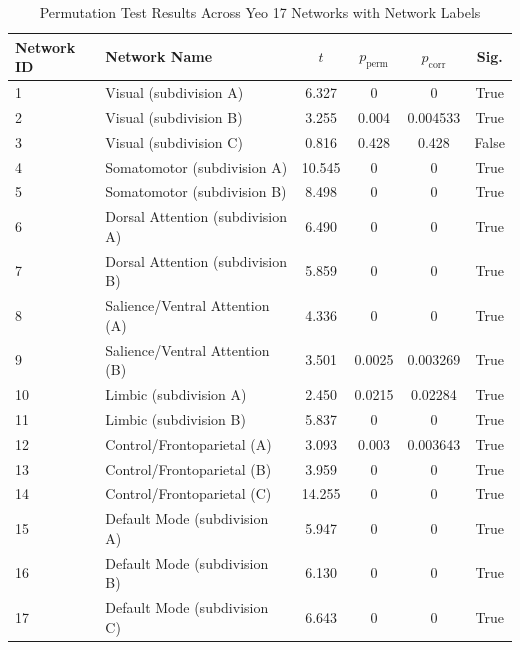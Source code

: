 \documentclass[stu,12pt,floatsintext]{apa7}
\begin{document}
\begin{table}[ht!]
\centering
\caption{Permutation Test Results Across Yeo 17 Networks with Network Labels}
\label{tab:permTest}
\begin{tabular}{llcccc}
\hline
\textbf{Network ID} & \textbf{Network Name} & \textbf{$t$} & \textbf{$p_{\text{perm}}$} & \textbf{$p_{\text{corr}}$} & \textbf{Sig.} \\
\hline
1  & Visual (subdivision A)              & 6.327  & 0      & 0      & True  \\
2  & Visual (subdivision B)              & 3.255  & 0.004  & 0.004533  & True  \\
3  & Visual (subdivision C)              & 0.816  & 0.428  & 0.428  & False \\
4  & Somatomotor (subdivision A)         & 10.545 & 0      & 0      & True  \\
5  & Somatomotor (subdivision B)         & 8.498  & 0      & 0      & True  \\
6  & Dorsal Attention (subdivision A)    & 6.490  & 0      & 0      & True  \\
7  & Dorsal Attention (subdivision B)    & 5.859  & 0      & 0      & True  \\
8  & Salience/Ventral Attention (A)      & 4.336  & 0      & 0      & True  \\
9  & Salience/Ventral Attention (B)      & 3.501  & 0.0025 & 0.003269 & True  \\
10 & Limbic (subdivision A)              & 2.450  & 0.0215 & 0.02284  & True  \\
11 & Limbic (subdivision B)              & 5.837  & 0      & 0      & True  \\
12 & Control/Frontoparietal (A)          & 3.093  & 0.003  & 0.003643 & True  \\
13 & Control/Frontoparietal (B)          & 3.959  & 0      & 0      & True  \\
14 & Control/Frontoparietal (C)          & 14.255 & 0      & 0      & True  \\
15 & Default Mode (subdivision A)        & 5.947  & 0      & 0      & True  \\
16 & Default Mode (subdivision B)        & 6.130  & 0      & 0      & True  \\
17 & Default Mode (subdivision C)        & 6.643  & 0      & 0      & True  \\
\hline
\end{tabular}
\end{table}
\end{document}
